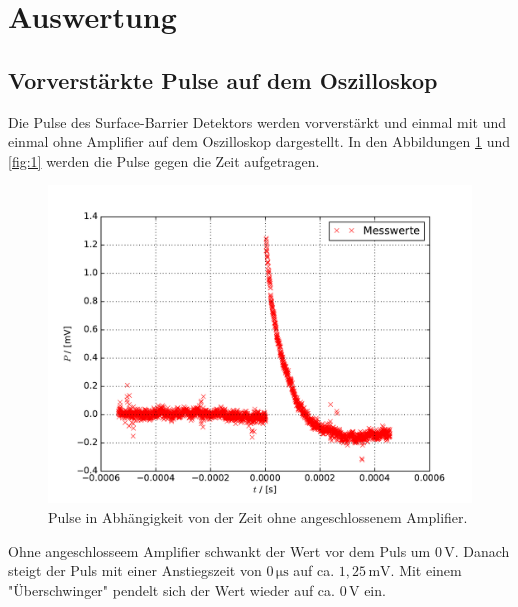 \section{Auswertung}
\subsection{Vorverstärkte Pulse auf dem Oszilloskop}
Die Pulse des Surface-Barrier Detektors werden vorverstärkt und einmal mit und einmal ohne Amplifier auf dem Oszilloskop dargestellt.
In den Abbildungen \ref{fig:2} und \ref{fig:1} werden die Pulse gegen die Zeit aufgetragen.

\begin{figure}[H]
  \centering
  \includegraphics[width=\textwidth]{osz2.pdf}
  \caption{Pulse in Abhängigkeit von der Zeit ohne angeschlossenem Amplifier.}
  \label{fig:2}
\end{figure}

Ohne angeschlosseem Amplifier schwankt der Wert vor dem Puls um $0\,\text{V}$.
Danach steigt der Puls mit einer Anstiegszeit von $0\,\si{\micro\second}$ auf ca. $1,25\,\text{mV}$.
Mit einem "Überschwinger" pendelt sich der Wert wieder auf ca. $0\,\text{V}$ ein.

